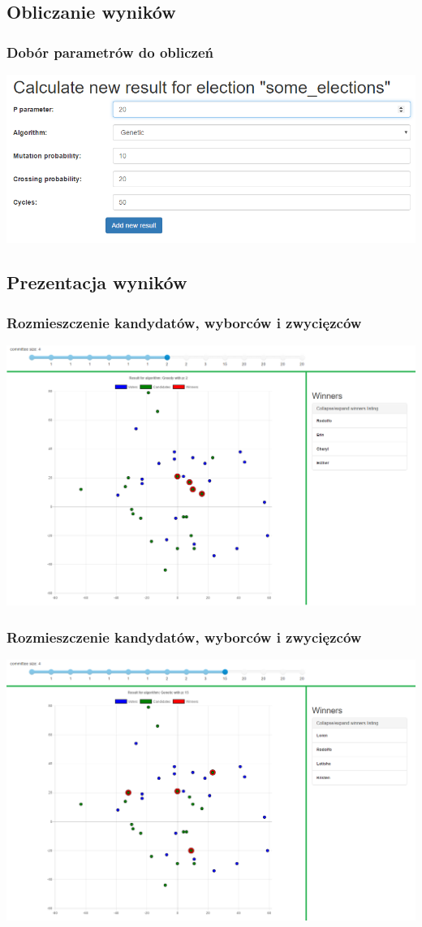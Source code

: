 \documentclass{beamer}
\begin{document}
\subsection{Obliczanie wyników}
\begin{frame}
\frametitle{Dobór parametrów do obliczeń}
\includegraphics[width=0.9\paperwidth]{pics/parameters.png}
\end{frame}

\subsection{Prezentacja wyników}
\begin{frame}
\frametitle{Rozmieszczenie kandydatów, wyborców i zwycięzców}
\includegraphics[width=0.80\paperwidth]{pics/chart_with_slider_and_winners.png}
\end{frame}

\begin{frame}
\frametitle{Rozmieszczenie kandydatów, wyborców i zwycięzców}
\includegraphics[width=0.80\paperwidth]{pics/chart_with_slider_and_winners_2.png}
\end{frame}
\end{document}
